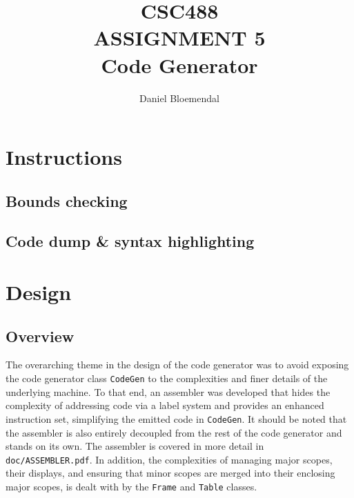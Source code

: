 \documentclass[oneside]{amsart}
\theoremstyle{definition}
\theoremstyle{remark}
\numberwithin{equation}{section}
\begin{document}
\title[CSC488 A5]{CSC488\\ASSIGNMENT 5\\Code Generator}
\author{Daniel Bloemendal}

\begin{titlepage}
\maketitle
\thispagestyle{empty}
\tableofcontents
\end{titlepage}

\section{Instructions}
\subsection{Bounds checking}
\subsection{Code dump \& syntax highlighting}

\section{Design}
\subsection{Overview}
The overarching theme in the design of the code generator was to avoid exposing the code generator
class \texttt{CodeGen} to the complexities and finer details of the underlying machine. To that
end, an assembler was developed that hides the complexity of addressing code via a label system and
provides an enhanced instruction set, simplifying the emitted code in \texttt{CodeGen}. It should be
noted that the assembler is also entirely decoupled from the rest of the code generator and stands
on its own. The assembler is covered in more detail in \texttt{doc/ASSEMBLER.pdf}. In addition, the
complexities of managing major scopes, their displays, and ensuring that minor scopes are merged
into their enclosing major scopes, is dealt with by the \texttt{Frame} and \texttt{Table} classes.
\end{document}

